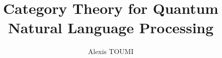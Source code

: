 

\title{Category Theory for Quantum\\
Natural Language Processing}
\author{Alexis TOUMI}

\degreedate{\today}




%
% 
%
%
%
%
% 
% 
% 
% 
%
%
% 
% 
% 
% 




